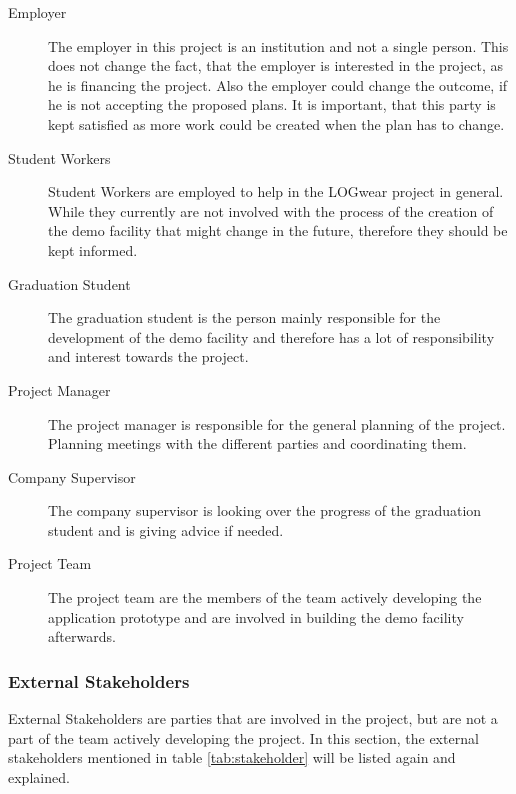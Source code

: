 \begin{description}
	\item[Employer] \hfill
	
	The employer in this project is an institution and not a single person. This does not change the fact, that the employer is interested in the project, as he is financing the project. Also the employer could change the outcome, if he is not accepting the proposed plans. It is important, that this party is kept satisfied as more work could be created when the plan has to change.
	\item[Student Workers] \hfill
	
	Student Workers are employed to help in the LOGwear project in general. While they currently are not involved with the process of the creation of the demo facility that might change in the future, therefore they should be kept informed.
	\item[Graduation Student] \hfill
	
	The graduation student is the person mainly responsible for the development of the demo facility and therefore has a lot of responsibility and interest towards the project.
	\item[Project Manager] \hfill
	
	The project manager is responsible for the general planning of the project. Planning meetings with the different parties and coordinating them.
	\item[Company Supervisor] \hfill
	
	The company supervisor is looking over the progress of the graduation student and is giving advice if needed. 
	\item[Project Team] \hfill
	
	The project team are the members of the team actively developing the application prototype and are involved in building the demo facility afterwards.
\end{description}

\subsubsection{External Stakeholders}\label{sssec:externalStakeholders}
External Stakeholders are parties that are involved in the project, but are not a part of the team actively developing the project. In this section, the external stakeholders mentioned in table \ref{tab:stakeholder} will be listed again and explained.

